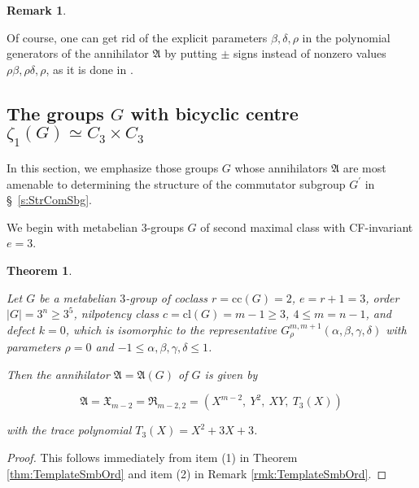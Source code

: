 \documentclass{amsart}
\newtheorem{theorem}{Theorem}[section]
\theoremstyle{definition}
\newtheorem{remark}{Remark}[section]
\numberwithin{equation}{section}
\begin{document}
\begin{remark}
\begin{enumerate}
\end{enumerate}

\noindent
Of course, one can get rid of the explicit parameters \(\beta,\delta,\rho\)
in the polynomial generators of the annihilator \(\mathfrak{A}\)
by putting \(\pm\) signs instead of nonzero values \(\rho\beta,\rho\delta,\rho\),
as it is done in
\cite{SoTa}.

\end{remark}



\subsection{The groups \(G\) with bicyclic centre \(\zeta_1(G)\simeq C_3\times C_3\)}
\label{ss:LowBic}

\noindent
In this section, we emphasize those groups \(G\)
whose annihilators \(\mathfrak{A}\) are most amenable to
determining the structure of the commutator subgroup \(G^\prime\) in \S\
\ref{s:StrComSbg}.

We begin with metabelian \(3\)-groups \(G\)
of second maximal class with CF-invariant \(e=3\).

\begin{theorem}
\label{thm:SmbOrdSecBic}

Let \(G\) be a metabelian \(3\)-group of coclass \(r=\mathrm{cc}(G)=2\), \(e=r+1=3\),
order \(\lvert G\rvert=3^n\ge 3^5\), nilpotency class \(c=\mathrm{cl}(G)=m-1\ge 3\), \(4\le m=n-1\),
and defect \(k=0\),
which is isomorphic to the representative \(G_\rho^{m,m+1}(\alpha,\beta,\gamma,\delta)\)
with parameters \(\rho=0\) and \(-1\le\alpha,\beta,\gamma,\delta\le 1\).

Then the annihilator \(\mathfrak{A}=\mathfrak{A}(G)\) of \(G\) is given by

\begin{equation}
\label{eqn:SmbOrdSecBic}
\mathfrak{A}=\mathfrak{X}_{m-2}=\mathfrak{R}_{m-2,2}=\left(X^{m-2},\ Y^2,\ XY,\ T_3(X)\right)
\end{equation}

\noindent
with the trace polynomial \(T_3(X)=X^2+3X+3\).

\end{theorem}

\begin{proof}
This follows immediately from item (1) in Theorem
\ref{thm:TemplateSmbOrd}
and item (2) in Remark
\ref{rmk:TemplateSmbOrd}.
\end{proof}
\end{document}
